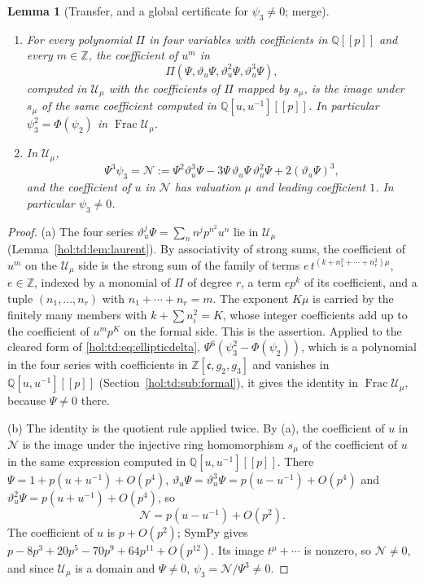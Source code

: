 \documentclass[11pt]{article}
\numberwithin{equation}{section}
\newtheorem{lemma}[theorem]{Lemma}
\theoremstyle{definition}
\theoremstyle{remark}
\newcommand{\Q}{\mathbb Q}
\newcommand{\Z}{\mathbb Z}
\begin{document}
\begin{lemma}[Transfer, and a global certificate for $\psi_3\ne0$; merge]
\label{hol:td:lem:psi3}
\begin{enumerate}[label=\textup{(\alph*)}]
\item For every polynomial $\Pi$ in four variables with coefficients in
$\Q[[p]]$ and every $m\in\Z$, the coefficient of $u^m$ in
\[
 \Pi(\Psi,\vartheta_u\Psi,\vartheta_u^2\Psi,\vartheta_u^3\Psi),
\]
computed in $\mathcal U_\mu$ with the coefficients of $\Pi$ mapped by
$s_\mu$, is the image under $s_\mu$ of the same coefficient computed in
$\Q[u,u^{-1}][[p]]$. In particular
$\psi_3^2=\Phi(\psi_2)$ in $\operatorname{Frac}\mathcal U_\mu$.
\item In $\mathcal U_\mu$,
\[
 \Psi^3\psi_3=\mathcal N:=\Psi^2\vartheta_u^3\Psi
 -3\Psi\,\vartheta_u\Psi\,\vartheta_u^2\Psi+2(\vartheta_u\Psi)^3,
\]
and the coefficient of $u$ in $\mathcal N$ has valuation $\mu$ and leading
coefficient $1$. In particular $\psi_3\ne0$.
\end{enumerate}
\end{lemma}

\begin{proof}
(a) The four series $\vartheta_u^j\Psi=\sum_nn^jp^{n^2}u^n$ lie in
$\mathcal U_\mu$ (Lemma~\ref{hol:td:lem:laurent}). By associativity of strong
sums, the coefficient of $u^m$ on the $\mathcal U_\mu$ side is the strong sum
of the family of terms $e\,t^{(k+n_1^2+\cdots+n_r^2)\mu}$, $e\in\Z$, indexed by
a monomial of $\Pi$ of degree $r$, a term $ep^k$ of its coefficient, and a
tuple $(n_1,\ldots,n_r)$ with $n_1+\cdots+n_r=m$. The exponent $K\mu$ is
carried by the finitely many members with $k+\sum n_i^2=K$, whose integer
coefficients add up to the coefficient of $u^mp^K$ on the formal side. This is
the assertion. Applied to the cleared form of \eqref{hol:td:eq:ellipticdelta},
$\Psi^6(\psi_3^2-\Phi(\psi_2))$, which is a polynomial in the four series
with coefficients in $\Z[\mathfrak c,g_2,g_3]$ and vanishes in
$\Q[u,u^{-1}][[p]]$ (Section~\ref{hol:td:sub:formal}), it gives the identity
in $\operatorname{Frac}\mathcal U_\mu$, because $\Psi\ne0$ there.

(b) The identity is the quotient rule applied twice. By (a), the coefficient
of $u$ in $\mathcal N$ is the image under the injective ring homomorphism
$s_\mu$ of the coefficient of $u$ in the same expression computed in
$\Q[u,u^{-1}][[p]]$. There $\Psi=1+p(u+u^{-1})+O(p^4)$, $\vartheta_u\Psi=\vartheta_u^3\Psi
=p(u-u^{-1})+O(p^4)$ and $\vartheta_u^2\Psi=p(u+u^{-1})+O(p^4)$, so
\[
 \mathcal N=p(u-u^{-1})+O(p^2).
\]
The coefficient of $u$ is $p+O(p^2)$; SymPy gives
$p-8p^3+20p^5-70p^9+64p^{11}+O(p^{12})$. Its image $t^\mu+\cdots$ is nonzero,
so $\mathcal N\ne0$, and since $\mathcal U_\mu$ is a domain and $\Psi\ne0$,
$\psi_3=\mathcal N/\Psi^3\ne0$.
\end{proof}
\end{document}

